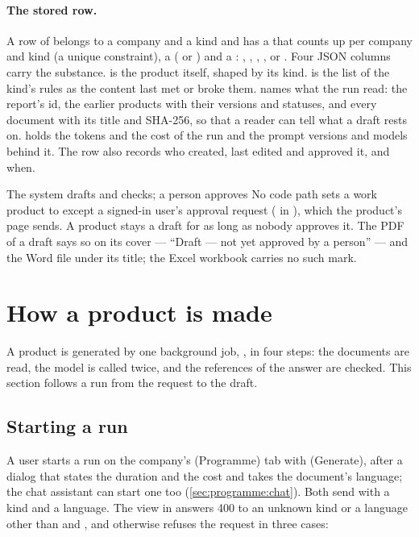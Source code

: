 \paragraph{The stored row.} A row of  belongs to a company and a kind and
has a  that counts up per company and kind (a unique constraint), a
 ( or ) and a : , ,
, ,  or . Four JSON columns carry the
substance.  is the product itself, shaped by its kind.  is the list
of the kind's rules as the content last met or broke them.  names what the run
read: the report's id, the earlier products with their versions and statuses, and every
document with its title and SHA-256, so that a reader can tell what a draft rests on.
 holds the tokens and the cost of the run and the prompt versions and models
behind it. The row also records who created, last edited and approved it, and when.

\begin{humanbox}{The system drafts and checks; a person approves}
No code path sets a work product to  except a signed-in user's approval request
( in ), which the product's page sends. A
product stays a draft for as long as nobody approves it. The PDF of a draft says so on its
cover --- \enquote{Draft --- not yet approved by a person} --- and the Word file under its
title; the Excel workbook carries no such mark.
\end{humanbox}


\section{How a product is made}\label{sec:programme:generation}

A product is generated by one background job, , in four steps: the
documents are read, the model is called twice, and the references of the answer are checked.
This section follows a run from the request to the draft.

\subsection{Starting a run}

A user starts a run on the company's  (Programme) tab with 
(Generate), after a dialog that states the duration and the cost and takes the document's
language; the chat assistant can start one too (\cref{sec:programme:chat}). Both send
 with a kind and a language. The view
 in  answers 400  to
an unknown kind or a language other than  and , and otherwise refuses the
request in three cases:


